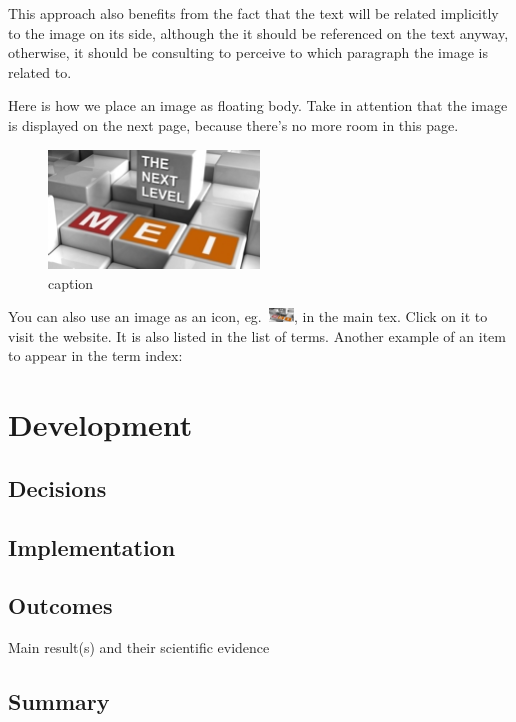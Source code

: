 \documentclass[
  oneside,
  11pt, a4paper,
  footinclude=true,
  headinclude=true,
  cleardoublepage=empty
]{scrbook}
\begin{document}
	This approach also benefits from the fact that the text will be related implicitly to the image on its side, although the it should be referenced on the text anyway, otherwise, it should be consulting to perceive to which paragraph the image is related to.

	Here is how we place an image as floating body.
	Take in attention that the image is displayed on the next page, because there's no more room in this page.
	\begin{figure}
	\begin{center}
		\includegraphics[width=0.5\textwidth]{img/mei-logo-03.jpg}
	\end{center}
	\caption{caption}
	\end{figure}



	You can also use an image as an icon, eg.~\href{http://mei.di.uminho.pt}{\includegraphics[width=0.05\textwidth]{img/mei-logo-03.jpg}}, in the main tex.
	Click on it to visit the website. It is also listed in the list of terms.
	Another example of an item to appear in the term index: %

	
	\chapter{Development}
		
	\section{Decisions}
    \section{Implementation}
    \section{Outcomes}
    Main result(s) and their scientific evidence
	\section{Summary}
\end{document}
